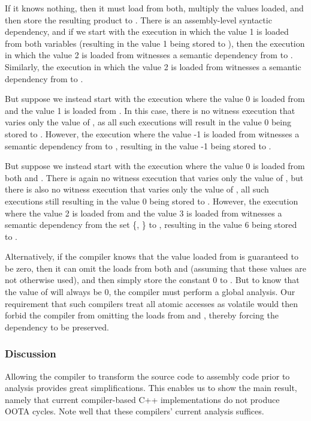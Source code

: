 If it knows nothing, then it must load from both, multiply the values
loaded, and then store the resulting product to .
There is an assembly-level syntactic dependency, and if we start
with the execution in which the value 1 is loaded from both variables
(resulting in the value 1 being stored to ),
then the execution in which the value 2 is loaded from  witnesses
a semantic dependency from  to .
Similarly, the execution in which the value 2 is loaded from 
witnesses a semantic dependency from  to .

But suppose we instead start with the execution where the value 0
is loaded from  and the value 1 is loaded from .
In this case, there is no witness execution that varies only the value
of , as all such executions will result in the value 0 being stored
to .
However, the execution where the value -1 is loaded from 
witnesses a semantic dependency from  to , resulting in
the value -1 being stored to .

But suppose we instead start with the execution where the value 0
is loaded from both  and .
There is again no witness execution that varies only the value of ,
but there is also no witness execution that varies only the value of ,
all such executions still resulting in the value 0 being stored to .
However, the execution where the value 2 is loaded from  and the
value 3 is loaded from  witnesses a semantic dependency from the
set \{, \} to , resulting in the value 6 being stored
to .

Alternatively, if the compiler knows that the value loaded from 
is guaranteed to be zero, then it can omit the loads from both 
and  (assuming that these values are not otherwise used), and
then simply store the constant 0 to .
But to know that the value of  will always be 0, the compiler
must perform a global analysis.
Our requirement that such compilers treat all atomic accesses as volatile
would then forbid the compiler from omitting the loads from 
and , thereby forcing the dependency to be preserved.

\subsubsection{Discussion}
\label{sec:Discussion}

Allowing the compiler to transform the source code to assembly code
prior to analysis provides great simplifications.
This enables us to show the main result, namely that current compiler-based
C++ implementations do not produce OOTA cycles.
Note well that these compilers' current analysis suffices.

